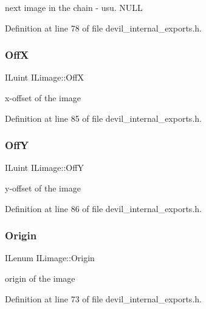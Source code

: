 next image in the chain -\/ usu. N\+U\+LL 



Definition at line 78 of file devil\+\_\+internal\+\_\+exports.\+h.

\mbox{\label{structILimage_ae0438126967c9e3fcdbf916776c7430c}} 
\subsubsection{\texorpdfstring{OffX}{OffX}}
{\footnotesize\ttfamily I\+Luint I\+Limage\+::\+OffX}



x-\/offset of the image 



Definition at line 85 of file devil\+\_\+internal\+\_\+exports.\+h.

\mbox{\label{structILimage_a3d0db9b9c3aa7399ff8fe82327e1cc42}} 
\subsubsection{\texorpdfstring{OffY}{OffY}}
{\footnotesize\ttfamily I\+Luint I\+Limage\+::\+OffY}



y-\/offset of the image 



Definition at line 86 of file devil\+\_\+internal\+\_\+exports.\+h.

\mbox{\label{structILimage_ac2bc011c3f8a65eea30a8d4495c96a2e}} 
\subsubsection{\texorpdfstring{Origin}{Origin}}
{\footnotesize\ttfamily I\+Lenum I\+Limage\+::\+Origin}



origin of the image 



Definition at line 73 of file devil\+\_\+internal\+\_\+exports.\+h.

\mbox{\label{structILimage_a1e17c6b3c912a9bcddb50dd7a61011a7}} 
